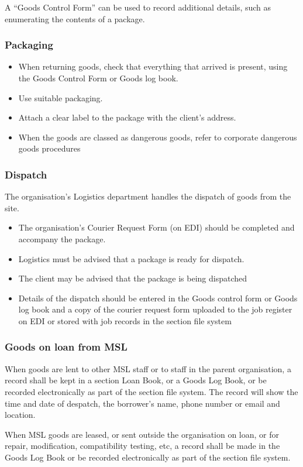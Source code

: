A ``Goods Control Form'' can be used to record additional details, such as enumerating the contents of a package. 

\subsubsection{Packaging}
\begin{itemize}
\item When returning goods, check that everything that arrived is present, using the Goods Control Form or Goods log book.
\item Use suitable packaging.
\item Attach a clear label to the package with the client's address.
\item When the goods are classed as dangerous goods, refer to corporate dangerous goods procedures
\end{itemize}

\subsubsection{Dispatch}
The organisation’s Logistics department handles the dispatch of goods from the site.
\begin{itemize}
\item The organisation’s Courier Request Form (on EDI) should be completed and accompany the package.
\item Logistics must be advised that a package is ready for dispatch.
\item The client may be advised that the package is being dispatched
\item Details of the dispatch should be entered in the Goods control form or Goods log book and a copy of the courier request form uploaded to the job register on EDI or stored with job records in the section file system
\end{itemize}

\subsubsection{Goods on loan from MSL}
When goods are lent to other MSL staff or to staff in the parent organisation, a record shall be kept in a section Loan Book, or a Goods Log Book, or be recorded electronically as part of the section file system. The record will show the time and date of despatch, the borrower’s name, phone number or email and location.

When MSL goods are leased, or sent outside the organisation on loan, or for repair, modification, compatibility testing, etc, a record shall be made in the Goods Log Book or be recorded electronically as part of the section file system. 